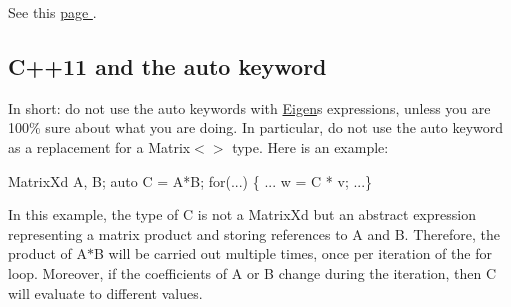See this \hyperlink{_topic_template_keyword}{page }.\hypertarget{_topic_pitfalls_TopicPitfalls_auto_keyword}{}\subsection{C++11 and the auto keyword}\label{_topic_pitfalls_TopicPitfalls_auto_keyword}
In short\+: do not use the auto keywords with \hyperlink{namespace_eigen}{Eigen}\textquotesingle{}s expressions, unless you are 100\% sure about what you are doing. In particular, do not use the auto keyword as a replacement for a Matrix$<$$>$ type. Here is an example\+:


\begin{DoxyCode}
MatrixXd A, B;
\textcolor{keyword}{auto} C = A*B;
\textcolor{keywordflow}{for}(...) \{ ... w = C * v;  ...\}
\end{DoxyCode}


In this example, the type of C is not a Matrix\+Xd but an abstract expression representing a matrix product and storing references to A and B. Therefore, the product of A$\ast$B will be carried out multiple times, once per iteration of the for loop. Moreover, if the coefficients of A or B change during the iteration, then C will evaluate to different values.

